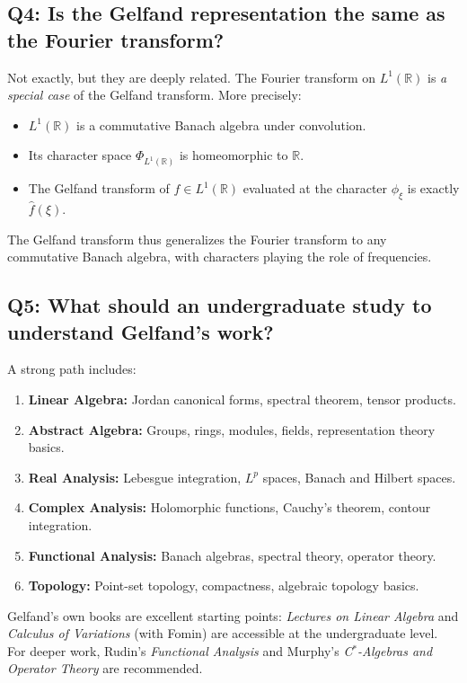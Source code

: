\subsection*{Q4: Is the Gelfand representation the same as the Fourier transform?}

Not exactly, but they are deeply related. The Fourier transform on $L^1(\mathbb{R})$ is \textit{a special case} of the Gelfand transform. More precisely:
\begin{itemize}
    \item $L^1(\mathbb{R})$ is a commutative Banach algebra under convolution.
    \item Its character space $\Phi_{L^1(\mathbb{R})}$ is homeomorphic to $\mathbb{R}$.
    \item The Gelfand transform of $f \in L^1(\mathbb{R})$ evaluated at the character $\phi_\xi$ is exactly $\hat{f}(\xi)$.
\end{itemize}
The Gelfand transform thus generalizes the Fourier transform to any commutative Banach algebra, with characters playing the role of frequencies.

\subsection*{Q5: What should an undergraduate study to understand Gelfand's work?}

A strong path includes:
\begin{enumerate}
    \item \textbf{Linear Algebra:} Jordan canonical forms, spectral theorem, tensor products.
    \item \textbf{Abstract Algebra:} Groups, rings, modules, fields, representation theory basics.
    \item \textbf{Real Analysis:} Lebesgue integration, $L^p$ spaces, Banach and Hilbert spaces.
    \item \textbf{Complex Analysis:} Holomorphic functions, Cauchy's theorem, contour integration.
    \item \textbf{Functional Analysis:} Banach algebras, spectral theory, operator theory.
    \item \textbf{Topology:} Point-set topology, compactness, algebraic topology basics.
\end{enumerate}

Gelfand's own books are excellent starting points: \textit{Lectures on Linear Algebra} and \textit{Calculus of Variations} (with Fomin) are accessible at the undergraduate level. For deeper work, Rudin's \textit{Functional Analysis} and Murphy's \textit{C$^*$-Algebras and Operator Theory} are recommended.

